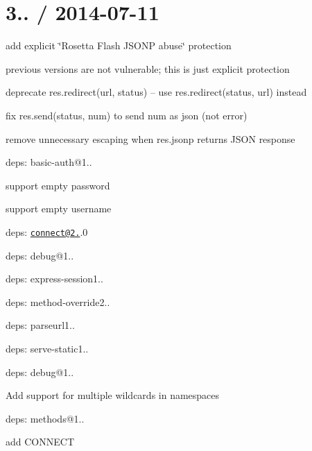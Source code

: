 \section*{3.. / 2014-\/07-\/11 }


\begin{DoxyItemize}
\item add explicit \char`\"{}\+Rosetta Flash J\+S\+O\+N\+P abuse\char`\"{} protection
\begin{DoxyItemize}
\item previous versions are not vulnerable; this is just explicit protection
\end{DoxyItemize}
\item deprecate {\ttfamily res.\+redirect(url, status)} -- use {\ttfamily res.\+redirect(status, url)} instead
\item fix {\ttfamily res.\+send(status, num)} to send {\ttfamily num} as json (not error)
\item remove unnecessary escaping when {\ttfamily res.\+jsonp} returns J\+S\+O\+N response
\item deps\+: basic-\/auth@1..
\begin{DoxyItemize}
\item support empty password
\item support empty username
\end{DoxyItemize}
\item deps\+: \href{mailto:connect@2.23}{\tt connect@2.}.0
\begin{DoxyItemize}
\item deps\+: debug@1..
\item deps\+: express-\/session1..
\item deps\+: method-\/override2..
\item deps\+: parseurl1..
\item deps\+: serve-\/static1..
\end{DoxyItemize}
\end{DoxyItemize}

deps\+: debug@1..
\begin{DoxyItemize}
\item Add support for multiple wildcards in namespaces
\end{DoxyItemize}

deps\+: methods@1..
\begin{DoxyItemize}
\item add {\ttfamily C\+O\+N\+N\+E\+C\+T}
\end{DoxyItemize}

